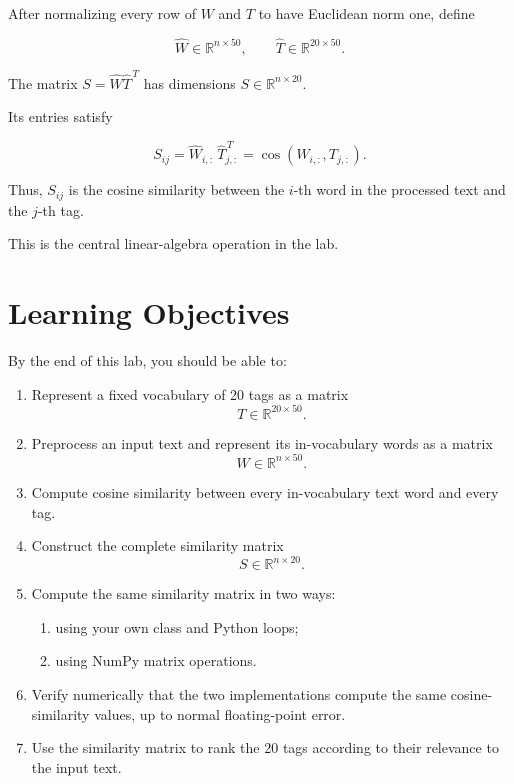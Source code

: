 \documentclass[12pt]{article}
\begin{document}
After normalizing every row of \(W\) and \(T\) to have Euclidean norm
one, define

\[
    \widehat{W} \in \mathbb{R}^{n \times 50},
    \qquad
    \widehat{T} \in \mathbb{R}^{20 \times 50}.
\]

The matrix $S = \widehat{W}\widehat{T}^{\,T}$ has dimensions
$S \in \mathbb{R}^{n \times 20}$.

Its entries satisfy

\[
    S_{ij} = \widehat{W}_{i,:} \, \widehat{T}_{j,:}^{\,T} = \cos(W_{i,:},T_{j,:}).
\]

Thus, \(S_{ij}\) is the cosine similarity between the \(i\)-th word
in the processed text and the \(j\)-th tag.

This is the central linear-algebra operation in the lab.

\section*{Learning Objectives}

By the end of this lab, you should be able to:

\begin{enumerate}
    \item Represent a fixed vocabulary of 20 tags as a matrix
    \[
    T \in \mathbb{R}^{20 \times 50}.
    \]

    \item Preprocess an input text and represent its in-vocabulary words
    as a matrix
    \[
    W \in \mathbb{R}^{n \times 50}.
    \]

    \item Compute cosine similarity between every in-vocabulary text
    word and every tag.

    \item Construct the complete similarity matrix
    \[
    S \in \mathbb{R}^{n \times 20}.
    \]

    \item Compute the same similarity matrix in two ways:
    \begin{enumerate}[label=(\alph*)]
        \item using your own {\color{blue}{Vector}} class and Python loops;
        \item using NumPy matrix operations.
    \end{enumerate}

    \item Verify numerically that the two implementations compute the
    same cosine-similarity values, up to normal floating-point error.

    \item Use the similarity matrix to rank the 20 tags according to
    their relevance to the input text.
\end{enumerate}
\end{document}
